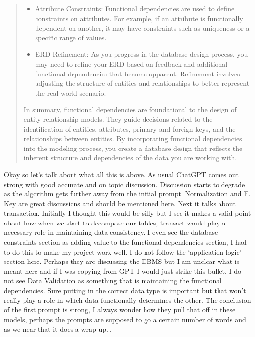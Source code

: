 \documentclass[11pt]{article}
\begin{document}
\begin{enumerate}
\begin{quotation}
\begin{itemize}
\item    Attribute Constraints:
        Functional dependencies are used to define constraints on attributes. For example, if an attribute is functionally dependent on another, it may have constraints such as uniqueness or a specific range of values.

\item    ERD Refinement:
        As you progress in the database design process, you may need to refine your ERD based on feedback and additional functional dependencies that become apparent. Refinement involves adjusting the structure of entities and relationships to better represent the real-world scenario.
\end{itemize}
In summary, functional dependencies are foundational to the design of entity-relationship models. They guide decisions related to the identification of entities, attributes, primary and foreign keys, and the relationships between entities. By incorporating functional dependencies into the modeling process, you create a database design that reflects the inherent structure and dependencies of the data you are working with.
\end{quotation}

Okay so let's talk about what all this is above.  As usual ChatGPT comes out strong with good accurate and on topic discussion.  Discussion starts to degrade as the algorithm gets further away from the initial prompt.  Normalization and F. Key are great discussions and should be mentioned here.  Next it talks about transaction.  Initially I thought this would be silly but I see it makes a valid point about how when we start to decompose our tables, transact would play a necessary role in maintaining data consistency.  I even see the database constraints section as adding value to the functional dependencies section, I had to do this to make my project work well.  I do not follow the `application logic' section here.  Perhaps they are discussing the DBMS but I am unclear what is meant here and if I was copying from GPT I would just strike this bullet.  I do not see Data Validation as something that is maintaining the functional dependencies.  Sure putting in the correct data type is important but that won't really play a role in which data functionally determines the other.  The conclusion of the first prompt is strong, I always wonder how they pull that off in these models, perhaps the prompts are supposed to go a certain number of words and as we near that it does a wrap up...  


\end{enumerate}
\end{document}
